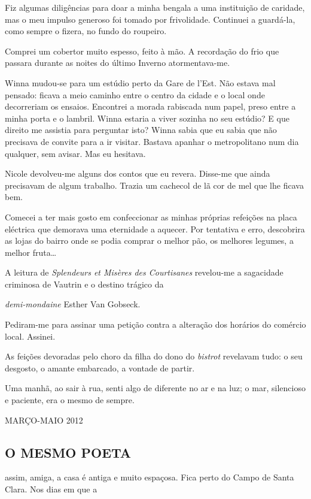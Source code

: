 Fiz algumas diligências para doar a minha bengala a uma instituição de
caridade, mas o meu impulso generoso foi tomado por frivolidade.
Continuei a guardá-la, como sempre o fizera, no fundo do roupeiro.

Comprei um cobertor muito espesso, feito à mão. A recordação do frio
que passara durante as noites do último Inverno atormentava-me.

Winna mudou-se para um estúdio perto da Gare de l'Est. Não estava mal
pensado: ficava a meio caminho entre o centro da cidade e o local onde
decorreriam os ensaios. Encontrei a morada rabiscada num papel, preso
entre a minha porta e
o lambril. Winna estaria a viver sozinha no seu estúdio? E que direito
me assistia para perguntar isto? Winna sabia que eu sabia que não
precisava de convite para a ir visitar. Bastava apanhar o metropolitano
num dia qualquer, sem avisar. Mas eu hesitava.

Nicole devolveu-me alguns dos contos que eu revera. Disse-me que ainda
precisavam de algum trabalho. Trazia um cachecol de lã cor de mel que
lhe ficava bem.

Comecei a ter mais gosto em confeccionar as minhas próprias refeições na
placa eléctrica que demorava uma eternidade a aquecer. Por tentativa e
erro, descobrira as lojas do bairro onde se podia comprar o melhor pão,
os melhores legumes, a melhor fruta\ldots{}

A leitura de \emph{Splendeurs et Misères des Courtisanes }revelou-me a sagacidade criminosa de Vautrin e o destino trágico da

\emph{demi-mondaine }Esther Van Gobseck.

Pediram-me para assinar uma petição contra a alteração dos horários do
comércio local. Assinei.

As feições devoradas pelo choro da filha do dono do \emph{bistrot
}revelavam tudo: o seu desgosto, o amante embarcado, a vontade de
partir.

Uma manhã, ao sair à rua, senti algo de diferente no ar e na luz; o mar,
silencioso e paciente, era o mesmo de sempre.

MARÇO-MAIO 2012

\subsection{O MESMO POETA}

assim, amiga, a casa é antiga e muito espaçosa. Fica perto do Campo de
Santa Clara. Nos dias em que a

